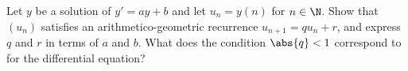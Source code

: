 \begin{exercise}[$\star\star\star$]\label{exo:tle:diffeq:9}
Let $y$ be a solution of $y' = ay + b$ and let $u_n = y(n)$ for $n \in \N$.
Show that $(u_n)$ satisfies an arithmetico-geometric recurrence
$u_{n+1} = q u_n + r$, and express $q$ and $r$ in terms of $a$ and $b$. What
does the condition $\abs{q} < 1$ correspond to for the differential
equation?
\end{exercise}
